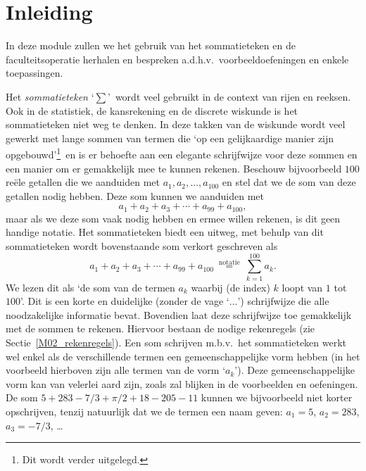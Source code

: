 \documentclass{ximera}
\begin{document}
    \author{Zomercursus KU Leuven}



\section*{Inleiding}
In deze module zullen we het gebruik van het
sommatieteken en de faculteitsoperatie herhalen en bespreken
a.d.h.v.~voorbeeldoefeningen en enkele toepassingen.

Het \emph{sommatieteken} \lq$\sum$\rq\ wordt veel gebruikt in de
context van rijen en reeksen. Ook in de statistiek, de
kansrekening en de discrete wiskunde is het sommatieteken niet weg
te denken. In deze takken van de wiskunde wordt veel gewerkt met
lange sommen van termen die \lq op een gelijkaardige manier zijn
opgebouwd\rq\footnote{Dit wordt verder uitgelegd.}\ en is er
behoefte aan een elegante schrijfwijze voor deze sommen en een
manier om er gemakkelijk mee te kunnen rekenen. Beschouw
bijvoorbeeld $100$ re\"ele getallen die we aanduiden met
$a_1,a_2,\ldots,a_{100}$ en stel dat we de som van deze getallen
nodig hebben. Deze som kunnen we aanduiden
met\[a_1+a_2+a_3+\cdots+a_{99}+a_{100},\]maar als we deze som vaak
nodig hebben en ermee willen rekenen, is dit geen handige notatie.
Het sommatieteken biedt een uitweg, met behulp van dit
sommatieteken wordt bovenstaande som verkort geschreven
als\[a_1+a_2+a_3+\cdots+a_{99}+a_{100}\
\overset{\textrm{notatie}}{=}\ \sum_{k=1}^{100}a_k.\]We lezen dit
als \lq de som van de termen $a_k$ waarbij (de index) $k$ loopt
van $1$ tot $100$\rq. Dit is een korte en duidelijke (zonder de
vage \lq$\ldots$\rq) schrijfwijze die alle noodzakelijke
informatie bevat. Bovendien laat deze schrijfwijze toe gemakkelijk
met de sommen te rekenen. Hiervoor bestaan de nodige rekenregels
(zie Sectie~\ref{M02_rekenregels}). Een som schrijven m.b.v.~het
sommatieteken werkt wel enkel als de verschillende termen een
gemeenschappelijke vorm hebben (in het voorbeeld hierboven zijn
alle termen van de vorm \lq$a_k$\rq). Deze gemeenschappelijke vorm
kan van velerlei aard zijn, zoals zal blijken in de voorbeelden en
oefeningen. De som $5+283-7/3+\pi/2+18-205-11$ kunnen we
bijvoorbeeld niet korter opschrijven, tenzij natuurlijk dat we de
termen een naam geven: $a_1=5$, $a_2=283$, $a_3=-7/3$, \ldots
\end{document}
